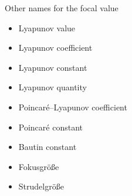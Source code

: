 \documentclass{article}
\begin{document}
Other names for the focal value
\begin{itemize}
    \item Lyapunov value

    \item Lyapunov coefficient

    \item Lyapunov constant

    \item Lyapunov quantity

    \item Poincar\'e--Lyapunov coefficient

    \item Poincar\'e constant

    \item Bautin constant

    \item Fokusgröße

    \item Strudelgröße
\end{itemize}
\end{document}
